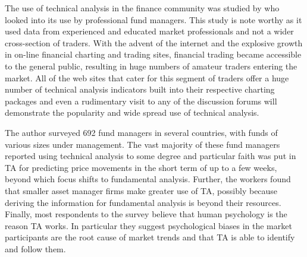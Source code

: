 The use of technical analysis in the finance community was studied by \cite{Menkhoff20102573} who looked into its use by professional fund managers. This study is note worthy as it used data from experienced and educated market professionals and not a wider cross-section of traders. With the advent of the internet and the explosive growth in on-line financial charting and trading sites, financial  trading became accessible to the general public, resulting in huge numbers of amateur traders entering the market. All of the web sites that cater for this segment of traders offer a huge number of technical analysis indicators built into their respective charting packages and even a rudimentary visit to any of the discussion forums will demonstrate the popularity and wide spread use of technical analysis. 
 
The author surveyed 692 fund managers in several countries, with funds of various sizes under management. The vast majority of these fund managers reported using technical analysis to some degree and particular faith was put in TA for predicting price movements in the short term of up to a few weeks, beyond which focus shifts to fundamental analysis. Further, the workers found that smaller asset manager firms make greater use of TA, possibly because deriving the information for fundamental analysis is beyond their resources. Finally, most respondents to the survey believe that human psychology is the reason TA works. In particular they suggest psychological biases in the market participants are the root cause of market trends and that TA is able to identify and follow them.

%
%
%
%

